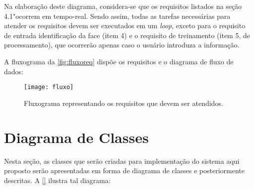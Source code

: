 Na elaboração deste diagrama, considera-se que os requisitos listados na seção 4.1"ocorrem em tempo-real. Sendo assim, todas as tarefas necessárias para atender os requisitos devem ser executados em um \textit{loop}, exceto para o requisito de entrada identificação da face (item 4) e o requisito de treinamento (item 5, de processamento), que ocorrerão apenas caso o usuário introduza a informação.

A fluxograma da \autoref{fig:fluxoreq} dispõe os requisitos e o diagrama de fluxo de dados:


\begin{figure}[h]
	\centering
	\texttt{[image: fluxo]}
	\caption{Fluxograma representando os requisitos que devem ser atendidos.}
	\label{fig:fluxoreq}
\end{figure}


\section{Diagrama de Classes}\label{sec:diagclasses}
Nesta seção, as classes que serão criadas para implementação do sistema aqui proposto serão apresentadas em forma de diagrama de classes e posteriormente descritas. A \autoref{} ilustra tal diagrama:









%
